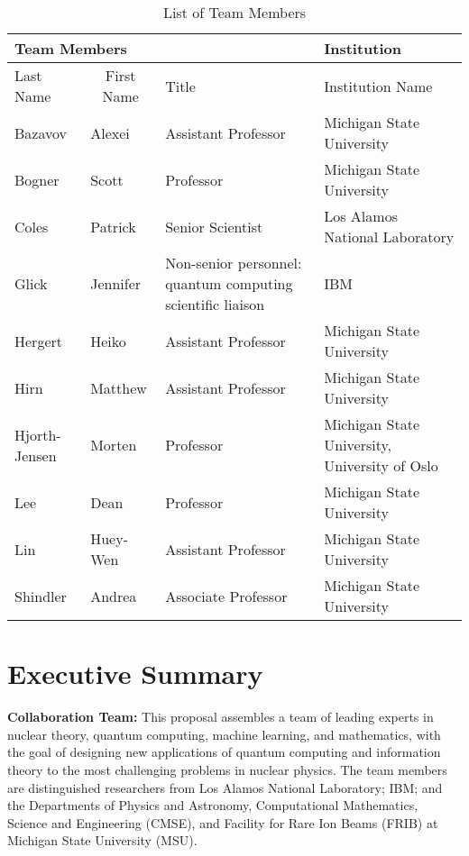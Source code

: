 \documentclass[10pt]{article}
\begin{document}
\begin{table}[hbtp]
\caption{List of Team Members}
\begin{center}
\begin{tabular}{|l|l|l|l|}
\hline
\multicolumn{3}{|l}{{\bf Team Members} } & \multicolumn{1}{|l|}{{\bf Institution}}\\
\hline
\multicolumn{1}{|l}{Last Name} & \multicolumn{1}{|c|}{First Name} & \multicolumn{1}{l|}{Title} & \multicolumn{1}{l|}{Institution Name} \\
\hline
Bazavov & Alexei & Assistant Professor & Michigan State University \\
\hline
Bogner & Scott & Professor & Michigan State University \\
\hline
Coles & Patrick & Senior Scientist & Los Alamos National Laboratory \\
\hline
Glick & Jennifer & Non-senior personnel: quantum computing scientific liaison & IBM \\
\hline
Hergert & Heiko & Assistant Professor & Michigan State University \\
\hline
Hirn & Matthew & Assistant Professor & Michigan State University \\
\hline
Hjorth-Jensen & Morten & Professor & Michigan State University, University of Oslo\\
\hline
Lee & Dean & Professor & Michigan State University \\
\hline
Lin & Huey-Wen & Assistant Professor & Michigan State University \\
\hline
Shindler & Andrea & Associate Professor & Michigan State University \\
\hline

\end{tabular}
\end{center}
\end{table}

\newpage
\section{Executive Summary}


{\bf Collaboration Team:} This proposal assembles a team of leading experts 
in nuclear theory, quantum computing, machine learning, and mathematics, with 
the goal of designing new applications of quantum computing and information theory 
to the most challenging problems in nuclear physics. The team members are 
distinguished researchers from Los Alamos National Laboratory; IBM; and the 
Departments of Physics and Astronomy, Computational Mathematics, Science and 
Engineering (CMSE), and Facility for Rare Ion Beams (FRIB) at 
Michigan State University (MSU).
\end{document}
